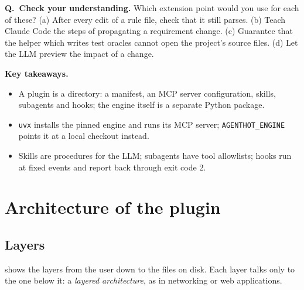 \documentclass[10pt,a4paper]{article}
\newcommand{\cc}{Claude Code}
\newcommand{\code}[1]{\texttt{#1}}
\newcounter{think}
\newenvironment{think}[1][Check your understanding]{%
  \refstepcounter{think}%
  \begin{tcolorbox}[enhanced, breakable, colback=thinkbg, colframe=thinkbg, arc=0pt, boxrule=0pt,
     borderline west={2.2pt}{0pt}{thinkbar}, left=8pt, right=8pt, top=5pt, bottom=5pt,
     before skip=8pt, after skip=8pt]
  \textsf{\bfseries\color{thinkbar}Q\thethink.\ #1.}\enspace}{\end{tcolorbox}}
\newenvironment{takeaway}{%
  \begin{tcolorbox}[enhanced, breakable, colback=keybg, colframe=keybg, arc=0pt, boxrule=0pt,
     borderline west={2.2pt}{0pt}{keybar}, left=8pt, right=8pt, top=5pt, bottom=5pt,
     before skip=8pt, after skip=8pt]
  \textsf{\bfseries\color{keybar}Key takeaways.}\par\smallskip}{\end{tcolorbox}}
\begin{document}
\begin{think}
Which extension point would you use for each of these? (a) After every
edit of a rule file, check that it still parses. (b) Teach \cc{} the steps
of propagating a requirement change. (c) Guarantee that the helper which
writes test oracles cannot open the project's source files. (d) Let the LLM
preview the impact of a change.
\end{think}

\begin{takeaway}
\begin{itemize}
\item A plugin is a directory: a manifest, an MCP server configuration,
skills, subagents and hooks; the engine itself is a separate Python package.
\item \code{uvx} installs the pinned engine and runs its MCP server;
\code{AGENTHOT\_ENGINE} points it at a local checkout instead.
\item Skills are procedures for the LLM; subagents have tool allowlists;
hooks run at fixed events and report back through exit code 2.
\end{itemize}
\end{takeaway}

\section{Architecture of the plugin}\label{sec:arch}

\subsection{Layers}

 shows the layers from the user down to the files on disk.
Each layer talks only to the one below it: a \emph{layered architecture},
as in networking or web applications.
\end{document}

